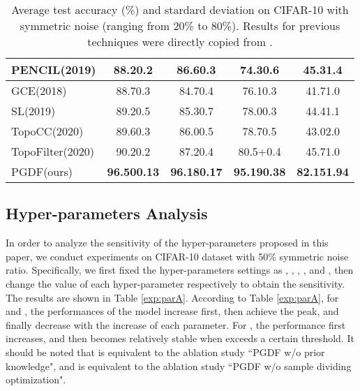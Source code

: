 \documentclass[letterpaper]{article} \usepackage{aaai22}  \usepackage{times}  \usepackage{helvet}  \usepackage{courier}  \usepackage[hyphens]{url}  \usepackage{graphicx} \urlstyle{rm} \def\UrlFont{\rm}  \usepackage{natbib}  \usepackage{caption} \DeclareCaptionStyle{ruled}{labelfont=normalfont,labelsep=colon,strut=off} \frenchspacing  \setlength{\pdfpagewidth}{8.5in}  \setlength{\pdfpageheight}{11in}  \usepackage{algorithm}
\begin{document}
\begin{table}[H]
\begin{tabular}{@{}l|cccc@{}}
PENCIL(2019)             & {88.20.2}          & {86.60.3}          & {74.30.6}          & {45.31.4}          \\ \midrule
GCE(2018)                & {88.70.3}          & {84.70.4}          & {76.10.3}          & {41.71.0}          \\ \midrule
SL(2019)                 & {89.20.5}          & {85.30.7}          & {78.00.3}          & {44.41.1}          \\ \midrule
TopoCC(2020)             & {89.60.3}          & {86.00.5}          & {78.70.5}          & {43.02.0}          \\ \midrule
TopoFilter(2020)         & {90.20.2}          & {87.20.4}          & {80.5+0.4}           & {45.71.0}          \\ \midrule
PGDF(ours)         & {\textbf{96.500.13}} & {\textbf{96.180.17}} & {\textbf{95.190.38}} & {\textbf{82.151.94}} \\ \bottomrule
\end{tabular}
\caption{Average test accuracy (\%) and stardard deviation on CIFAR-10 with symmetric noise (ranging from 20\% to 80\%). Results for previous techniques were directly copied from \cite{2020A}.}
\label{table:sup}
\end{table}

\subsection{Hyper-parameters Analysis}
In order to analyze the sensitivity of the hyper-parameters proposed in this paper, we conduct experiments on CIFAR-10 dataset with 50\% symmetric noise ratio. Specifically, we first fixed the hyper-parameters settings as , , , , and ,  then change the value of each hyper-parameter respectively to obtain the sensitivity. The results are shown in Table \ref{exp:parA}. According to Table \ref{exp:parA}, for  and , the performances of the model increase first, then achieve the peak, and finally decrease with the increase of each parameter. For , the performance first increases, and then becomes relatively stable when  exceeds a certain threshold. It should be noted that  is equivalent to the ablation study ``PGDF w/o prior knowledge", and  is equivalent to the ablation study ``PGDF w/o sample dividing optimization".
\end{document}
